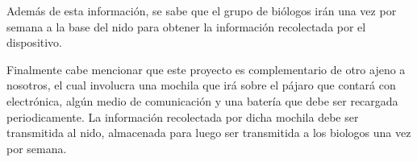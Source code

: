 Además de esta información, se sabe que el grupo de biólogos irán una vez por semana a la base del nido para obtener la información recolectada por el dispositivo.


Finalmente cabe mencionar que este proyecto es complementario de otro ajeno a nosotros, el cual involucra una mochila que irá sobre el pájaro que contará con electrónica, algún medio de comunicación y una batería que debe ser recargada periodicamente.
La información recolectada por dicha mochila debe ser transmitida al nido, almacenada para luego ser transmitida a los biologos una vez por semana.


%